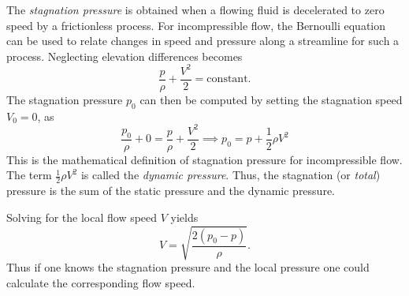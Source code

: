 The \textit{stagnation pressure} is obtained when a flowing fluid is decelerated to zero speed by a frictionless process. For incompressible flow, the Bernoulli equation can be used to relate changes in speed and pressure along a streamline for such a process. Neglecting elevation differences  becomes
\[ 
\frac{p}{\rho} + \frac{V^2}{2} = \mathrm{constant}
.\]
The stagnation pressure $p_0$ can then be computed by setting the stagnation speed $V_0 = 0$, as
\begin{equation}\label{eq:stagpre}
  \frac{p_0}{\rho} + 0 = \frac{p}{\rho} + \frac{V^2}{2} \implies p_0 = p + \frac{1}{2}\rho V^2
\end{equation}
This is the mathematical definition of stagnation pressure for incompressible flow. The term $\frac{1}{2}\rho V^2$ is called the \textit{dynamic pressure}. Thus, the stagnation  (or \textit{total}) pressure is the sum of the static pressure and the dynamic pressure.

Solving  for the local flow speed $V$ yields
\[ 
V = \sqrt{\frac{2 \left( p_0 - p \right)}{\rho}}
.\]
Thus if one knows the stagnation pressure and the local pressure one could calculate the corresponding flow speed.
